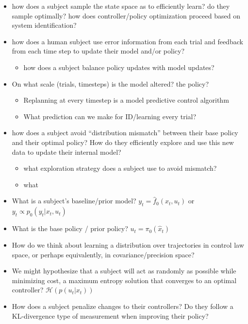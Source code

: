 \documentclass[
  a4paper,
]{article}
\providecommand{\tightlist}{%
  \setlength{\itemsep}{0pt}\setlength{\parskip}{0pt}}
\begin{document}
\begin{itemize}
\tightlist
\item
  how does a subject sample the state space as to efficiently learn? do
  they sample optimally? how does controller/policy optimization proceed
  based on system identification?
\item
  how does a human subject use error information from each trial and
  feedback from each time step to update their model and/or policy?

  \begin{itemize}
  \tightlist
  \item
    how does a subject balance policy updates with model updates?
  \end{itemize}
\item
  On what scale (trials, timesteps) is the model altered? the policy?

  \begin{itemize}
  \tightlist
  \item
    Replanning at every timestep is a model predictive control algorithm
  \item
    What prediction can we make for ID/learning every trial?
  \end{itemize}
\item
  how does a subject avoid ``distribution mismatch'' between their base
  policy and their optimal policy? How do they efficiently explore and
  use this new data to update their internal model?

  \begin{itemize}
  \tightlist
  \item
    what exploration strategy does a subject use to avoid mismatch?
  \item
    what
  \end{itemize}
\item
  What is a subject's baseline/prior model?
  \(y_{t} = \hat{f}_0(x_t,u_t)\) or \(y_{t} \propto p_0(y_t|x_{t},u_t)\)
\item
  What is the base policy / prior policy? \(u_t = \pi_0(\hat{x}_t)\)
\item
  How do we think about learning a distribution over trajectories in
  control law space, or perhaps equivalently, in covariance/precision
  space?
\item
  We might hypothesize that a subject will act as randomly as possible
  while minimizing cost, a maximum entropy solution that converges to an
  optimal controller? \(\mathcal{H}(p(u_t|x_t))\)
\item
  How does a subject penalize changes to their controllers? Do they
  follow a KL-divergence type of measurement when improving their
  policy?
\end{itemize}
\end{document}
